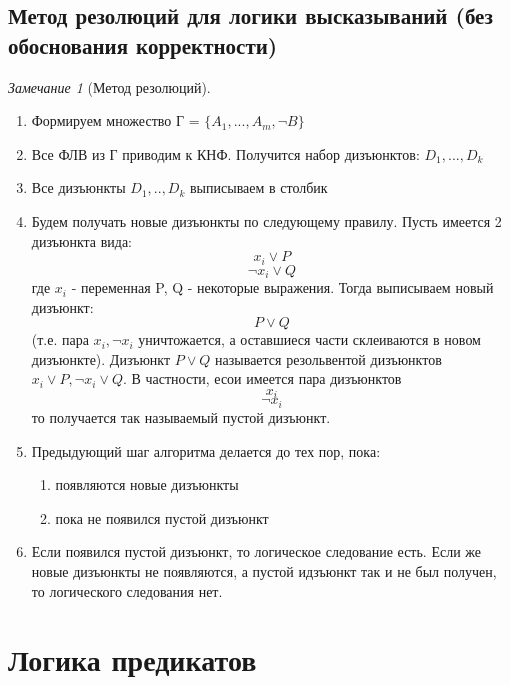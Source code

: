 \documentclass[a4paper]{article}
\theoremstyle{definition}
\theoremstyle{remark}
\newtheorem*{remark}{Замечание}
\begin{document}
    \subsection{Метод резолюций для логики высказываний (без обоснования корректности)}
	\begin{remark}[Метод резолюций]
		\begin{enumerate}
			\item Формируем множество Г = $\{A_1, ..., A_m, \neg B\}$
			\item Все ФЛВ из Г приводим к КНФ. Получится набор дизъюнктов: $D_1, ..., D_k$
			\item Все дизъюнкты $D_1, .., D_k$ выписываем в столбик
			\item  Будем получать новые дизъюнкты по следующему правилу. Пусть имеется 2 дизъюнкта вида: $$x_i \vee P$$ $$\neg x_i \vee Q$$
			где $x_i$ - переменная P, Q - некоторые выражения. Тогда выписываем новый дизъюнкт: $$P \vee Q$$
			(т.е. пара $x_i, \neg x_i$ уничтожается, а оставшиеся части склеиваются в новом дизъюнкте). Дизъюнкт $P \vee Q$ называется резольвентой дизъюнктов $x_i \vee P, \neg x_i \vee Q.$ В частности, есои имеется пара дизъюнктов $$x_i$$ $$\neg x_i$$ то получается так называемый пустой дизъюнкт.
			\item Предыдующий шаг алгоритма делается до тех пор, пока:
			\begin{enumerate}
				\item появляются новые дизъюнкты
				\item пока не появился пустой дизъюнкт
			\end{enumerate}
			\item Если появился пустой дизъюнкт, то логическое следование есть. Если же новые дизъюнкты не появляются, а пустой идзъюнкт так и не был получен, то логического следования нет.
		\end{enumerate}
	\end{remark}
    \section{Логика предикатов}
\end{document}
